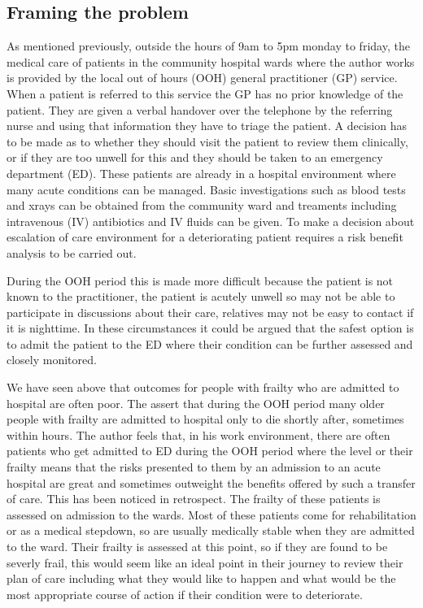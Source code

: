 \documentclass[12pt,a4paper,oneside,titlepage]{article}
\begin{document}
\subsection*{Framing the problem}
As mentioned previously, outside the hours of 9am to 5pm monday to friday, the medical
care of patients in the community hospital wards where the author works is provided
by the local out of hours (OOH) general practitioner (GP) service. When a patient
is referred to this service the GP has no prior knowledge of the patient. They are
given a verbal handover over the telephone by the referring nurse and using that information
they have to triage the patient. A decision has to be made as to whether they should visit
the patient to review them clinically, or if they are too unwell for this and they 
should be taken to an emergency department (ED). These patients
are already in a hospital environment where many acute conditions can be managed.
Basic investigations such as blood tests and xrays can be obtained from the community
ward and treaments including intravenous (IV) antibiotics and IV fluids can be given.
To make a decision about escalation of care environment for a deteriorating patient
requires a risk benefit analysis to be carried out. 

During the OOH period this is 
made more difficult because the patient is not known to the practitioner, the patient
is acutely unwell so may not be able to participate in discussions about their care,
relatives may not be easy to contact if it is nighttime. In these circumstances it could
be argued that the safest option is to admit the patient to the ED where their 
condition can be further assessed and closely monitored. 

We have seen above that outcomes for people with frailty who are admitted to hospital
are often poor. The \textcite{silver:12} assert that during the OOH period many older
people with frailty are admitted to hospital only to die shortly after, sometimes within
hours. The author feels that, in his work environment, there are often 
patients who get admitted to ED during the OOH period where the level or their frailty
means that the risks presented to them by an admission to an acute hospital are great
and sometimes outweight the benefits offered by such a transfer of care. This has
been noticed in retrospect. The frailty of these patients is assessed on admission
to the wards. Most of these patients come for rehabilitation or as a medical stepdown,
so are usually medically stable when they are admitted to the ward. Their frailty 
is assessed at this point, so if they are found to be severly frail, this would
seem like an ideal point in their journey to review their plan of care including
what they would like to happen and what would be the most appropriate course of 
action if their condition were to deteriorate.
\end{document}
